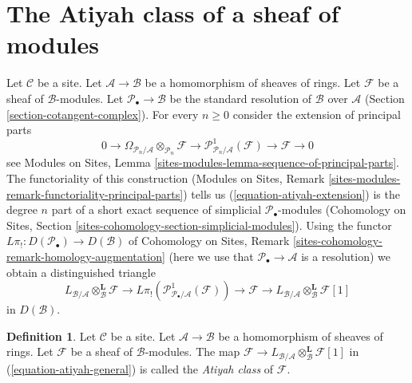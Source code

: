 \documentclass{stacks-project}
\theoremstyle{plain}
\theoremstyle{definition}
\newtheorem{definition}[subsection]{Definition}
\theoremstyle{remark}
\numberwithin{equation}{subsection}
\begin{document}
\section{The Atiyah class of a sheaf of modules}
\label{section-atiyah-general}

\noindent
Let $\mathcal{C}$ be a site. Let $\mathcal{A} \to \mathcal{B}$ be a
homomorphism of sheaves of rings. Let $\mathcal{F}$ be a
sheaf of $\mathcal{B}$-modules. Let $\mathcal{P}_\bullet \to \mathcal{B}$
be the standard resolution of $\mathcal{B}$ over $\mathcal{A}$
(Section \ref{section-cotangent-complex}).
For every $n \geq 0$ consider the extension of principal parts
\begin{equation}
\label{equation-atiyah-extension}
0 \to
\Omega_{\mathcal{P}_n/\mathcal{A}} \otimes_{\mathcal{P}_n} \mathcal{F} \to
\mathcal{P}^1_{\mathcal{P}_n/\mathcal{A}}(\mathcal{F}) \to
\mathcal{F} \to 0
\end{equation}
see
Modules on Sites, Lemma \ref{sites-modules-lemma-sequence-of-principal-parts}.
The functoriality of this construction
(Modules on Sites, Remark
\ref{sites-modules-remark-functoriality-principal-parts})
tells us (\ref{equation-atiyah-extension}) is the degree $n$ part of
a short exact sequence of simplicial $\mathcal{P}_\bullet$-modules
(Cohomology on Sites, Section
\ref{sites-cohomology-section-simplicial-modules}).
Using the functor $L\pi_! : D(\mathcal{P}_\bullet) \to D(\mathcal{B})$
of Cohomology on Sites, Remark
\ref{sites-cohomology-remark-homology-augmentation}
(here we use that $\mathcal{P}_\bullet \to \mathcal{A}$ is a resolution)
we obtain a distinguished triangle
\begin{equation}
\label{equation-atiyah-general}
L_{\mathcal{B}/\mathcal{A}} \otimes_\mathcal{B}^\mathbf{L} \mathcal{F} \to
L\pi_!\left(\mathcal{P}^1_{\mathcal{P}_\bullet/\mathcal{A}}(\mathcal{F})\right)
\to \mathcal{F} \to
L_{\mathcal{B}/\mathcal{A}} \otimes_\mathcal{B}^\mathbf{L} \mathcal{F} [1]
\end{equation}
in $D(\mathcal{B})$.

\begin{definition}
\label{definition-atiyah-class-general}
Let $\mathcal{C}$ be a site.
Let $\mathcal{A} \to \mathcal{B}$ be a homomorphism of sheaves of rings.
Let $\mathcal{F}$ be a sheaf of $\mathcal{B}$-modules.
The map $\mathcal{F} \to
L_{\mathcal{B}/\mathcal{A}} \otimes_\mathcal{B}^\mathbf{L} \mathcal{F}[1]$
in (\ref{equation-atiyah-general}) is called the {\it Atiyah class} of
$\mathcal{F}$.
\end{definition}
\end{document}
